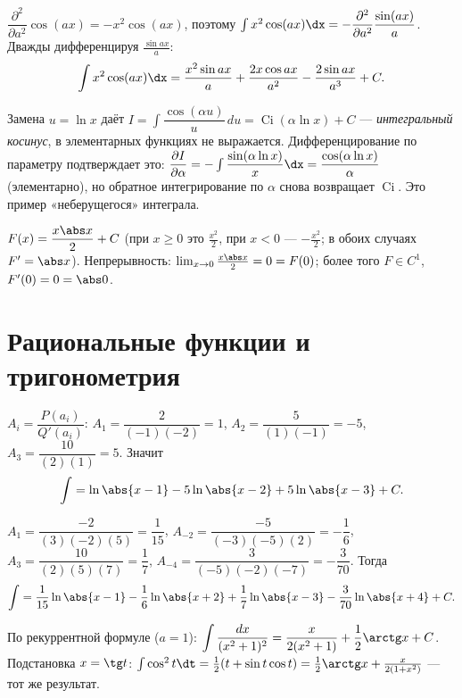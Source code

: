 \sol $\dfrac{\partial^2}{\partial a^2}\cos(ax)=-x^2\cos(ax)$, поэтому
$\int x^2\cos(ax)\dx=-\dfrac{\partial^2}{\partial a^2}\dfrac{\sin(ax)}{a}$. Дважды дифференцируя
$\tfrac{\sin ax}{a}$:
\[
  \int x^2\cos(ax)\dx=\frac{x^2\sin ax}{a}+\frac{2x\cos ax}{a^2}-\frac{2\sin ax}{a^3}+C.
\]

\sol Замена $u=\ln x$ даёт $I=\int\dfrac{\cos(\alpha u)}{u}\,du=\operatorname{Ci}(\alpha\ln x)+C$ —
\emph{интегральный косинус}, в элементарных функциях не выражается. Дифференцирование по параметру
подтверждает это: $\dfrac{\partial I}{\partial\alpha}=-\int\dfrac{\sin(\alpha\ln x)}{x}\dx
=\dfrac{\cos(\alpha\ln x)}{\alpha}$ (элементарно), но обратное интегрирование по $\alpha$ снова
возвращает $\operatorname{Ci}$. Это пример «неберущегося» интеграла.

\sol $F(x)=\dfrac{x\abs x}{2}+C$ (при $x\ge0$ это $\tfrac{x^2}2$, при $x<0$ — $-\tfrac{x^2}2$;
в обоих случаях $F'=\abs x$). Непрерывность: $\lim_{x\to0}\tfrac{x\abs x}{2}=0=F(0)$; более того
$F\in C^1$, $F'(0)=0=\abs0$.

\section{Рациональные функции и тригонометрия}

\sol $A_i=\dfrac{P(a_i)}{Q'(a_i)}$: $A_1=\dfrac{2}{(-1)(-2)}=1$, $A_2=\dfrac{5}{(1)(-1)}=-5$,
$A_3=\dfrac{10}{(2)(1)}=5$. Значит
\[
  \int=\ln\abs{x-1}-5\ln\abs{x-2}+5\ln\abs{x-3}+C.
\]

\sol $A_1=\dfrac{-2}{(3)(-2)(5)}=\dfrac1{15}$, $A_{-2}=\dfrac{-5}{(-3)(-5)(2)}=-\dfrac16$,
$A_3=\dfrac{10}{(2)(5)(7)}=\dfrac17$, $A_{-4}=\dfrac{3}{(-5)(-2)(-7)}=-\dfrac3{70}$. Тогда
\[
  \int=\frac1{15}\ln\abs{x-1}-\frac16\ln\abs{x+2}+\frac17\ln\abs{x-3}-\frac3{70}\ln\abs{x+4}+C.
\]

\sol По рекуррентной формуле ($a=1$): $\displaystyle\int\frac{dx}{(x^2+1)^2}=\frac{x}{2(x^2+1)}
+\frac12\arctg x+C$. Подстановка $x=\tg t$: $\int\cos^2t\dt=\tfrac12(t+\sin t\cos t)
=\tfrac12\arctg x+\tfrac{x}{2(1+x^2)}$ — тот же результат.

